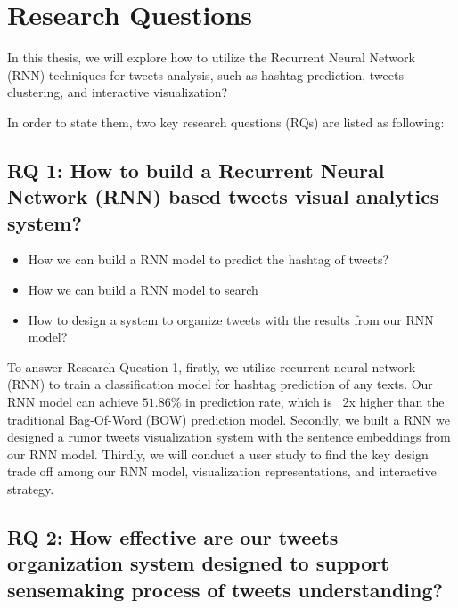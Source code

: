 \section{Research Questions}

In this thesis, we will explore how to utilize the Recurrent Neural Network (RNN) techniques for tweets analysis, such as hashtag prediction, tweets clustering, and interactive visualization?



In order to state them, two key research questions (RQs) are listed as following: 

\subsection{RQ 1: How to build a Recurrent Neural Network (RNN) based tweets visual analytics system?}

\begin{itemize}
    \item How we can build a RNN model to predict the hashtag of tweets?
    \item How we can build a RNN model to search 
    \item How to design a system to organize tweets with the results from our RNN model? 

\end{itemize}

To answer Research Question 1,  firstly, we utilize recurrent neural network (RNN) to train a classification model for hashtag prediction of any texts. Our RNN model can achieve $51.86\%$ in prediction rate, which is ~2x higher than the traditional Bag-Of-Word (BOW) prediction model. Secondly, we built a RNN we designed a rumor tweets visualization system with the sentence embeddings from our RNN model. Thirdly, we will conduct a user study to find the key design trade off among our RNN model, visualization representations, and interactive strategy.

    
\subsection{RQ 2: How effective are our tweets organization system designed to support sensemaking process of tweets  understanding? }

